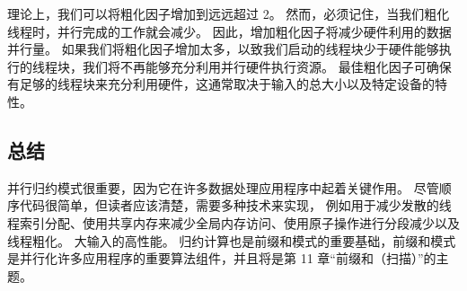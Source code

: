 理论上，我们可以将粗化因子增加到远远超过 2。 然而，必须记住，当我们粗化线程时，并行完成的工作就会减少。 
因此，增加粗化因子将减少硬件利用的数据并行量。 
如果我们将粗化因子增加太多，以致我们启动的线程块少于硬件能够执行的线程块，我们将不再能够充分利用并行硬件执行资源。 
最佳粗化因子可确保有足够的线程块来充分利用硬件，这通常取决于输入的总大小以及特定设备的特性。

\subsection{总结}
并行归约模式很重要，因为它在许多数据处理应用程序中起着关键作用。 尽管顺序代码很简单，但读者应该清楚，需要多种技术来实现，
例如用于减少发散的线程索引分配、使用共享内存来减少全局内存访问、使用原子操作进行分段减少以及线程粗化。 大输入的高性能。 
归约计算也是前缀和模式的重要基础，前缀和模式是并行化许多应用程序的重要算法组件，并且将是第 11 章“前缀和（扫描）”的主题。